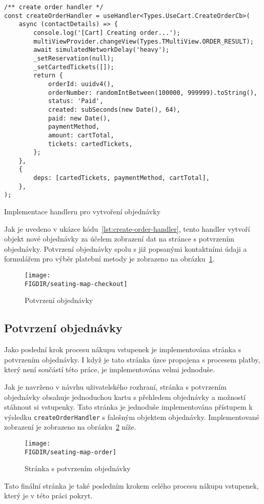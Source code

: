 \begin{listing}[!h]
\begin{verbatim}
/** create order handler */
const createOrderHandler = useHandler<Types.UseCart.CreateOrderCb>(
	async (contactDetails) => {
		console.log('[Cart] Creating order...');
		multiViewProvider.changeView(Types.TMultiView.ORDER_RESULT);
		await simulatedNetworkDelay('heavy');
		_setReservation(null);
		_setCartedTickets([]);
		return {
			orderId: uuidv4(),
			orderNumber: randomIntBetween(100000, 999999).toString(),
			status: 'Paid',
			created: subSeconds(new Date(), 64),
			paid: new Date(),
			paymentMethod,
			amount: cartTotal,
			tickets: cartedTickets,
		};
	},
	{
		deps: [cartedTickets, paymentMethod, cartTotal],
	},
);
\end{verbatim}
\caption{Implementace handleru pro vytvoření objednávky}
\label{lst:create-order-handler}
\end{listing}

Jak je uvedeno v ukázce kódu~\ref{lst:create-order-handler}, tento handler vytvoří objekt nové objednávky za účelem zobrazení dat na stránce s potvrzením objednávky.
Potvrzení objednávky spolu s již popsanými kontaktními údaji a formulářem pro výběr platební metody je zobrazeno na obrázku~\ref{fig:seating-map-checkout}.

\begin{figure}[H]
	\centering
	\texttt{[image: \\FIGDIR/seating-map-checkout]}
	\caption{Potvrzení objednávky}
	\label{fig:seating-map-checkout}
\end{figure}

\subsection{Potvrzení objednávky}
\label{subsec:implementace-checkout-order-confirmation}
Jako poslední krok procesu nákupu vstupenek je implementována stránka s potvrzením objednávky.
I když je tato stránka úzce propojena s procesem platby, který není součástí této práce, je implementována velmi jednoduše.

Jak je navrženo v návrhu uživatelského rozhraní, stránka s potvrzením objednávky obsahuje jednoduchou kartu s přehledem objednávky a možností stáhnout si vstupenky.
Tato stránka je jednoduše implementována přístupem k výsledku \texttt{createOrderHandler} s falešným objektem objednávky.
Implementované zobrazení je zobrazeno na obrázku~\ref{fig:seating-map-order} níže.

\begin{figure}[H]
	\centering
	\texttt{[image: \\FIGDIR/seating-map-order]}
	\caption{Stránka s potvrzením objednávky}
	\label{fig:seating-map-order}
\end{figure}

Tato finální stránka je také posledním krokem celého procesu nákupu vstupenek, který je v této práci pokryt.
